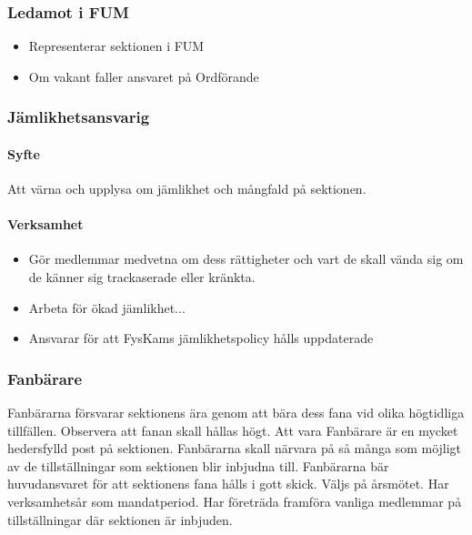 \documentclass{../resources/dgovdoc}
\begin{document}
\subsubsection{Ledamot i FUM}

\begin{itemize}

	\item Representerar sektionen i FUM
	\item Om vakant faller ansvaret på Ordförande

\end{itemize}

\subsubsection{Jämlikhetsansvarig}

\paragraph{Syfte}

Att värna och upplysa om jämlikhet och mångfald på sektionen.

\paragraph{Verksamhet}

\begin{itemize}

\item Gör medlemmar medvetna om dess rättigheter och vart de skall vända sig om de känner sig trackaserade eller kränkta.
\item Arbeta för ökad jämlikhet...
\item Ansvarar för att FysKams jämlikhetspolicy hålls uppdaterade

\end{itemize}

\subsubsection{Fanbärare}

Fanbärarna försvarar sektionens ära genom att bära dess fana vid olika högtidliga tillfällen.
Observera att fanan skall hållas högt. Att vara Fanbärare är en mycket hedersfylld post på sektionen. 
Fanbärarna skall närvara på så många som möjligt av de tillställningar som sektionen blir inbjudna till.
Fanbärarna bär huvudansvaret för att sektionens fana hålls i gott skick. 
Väljs på årsmötet. Har verksamhetsår som mandatperiod. Har företräda framföra vanliga medlemmar på
tillställningar där sektionen är inbjuden.
\end{document}
